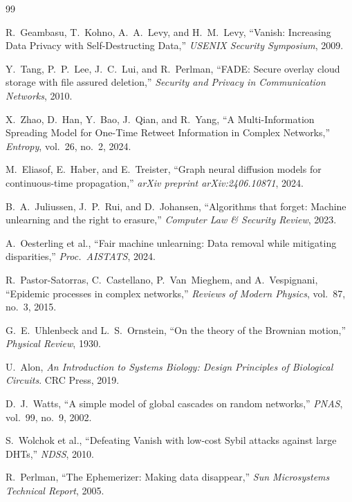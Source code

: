 \documentclass[conference]{IEEEtran}
\begin{document}
\begin{thebibliography}{99}

R.~Geambasu, T.~Kohno, A.~A.~Levy, and H.~M.~Levy,
``Vanish: Increasing Data Privacy with Self-Destructing Data,''
\textit{USENIX Security Symposium}, 2009.

Y.~Tang, P.~P.~Lee, J.~C.~Lui, and R.~Perlman,
``FADE: Secure overlay cloud storage with file assured deletion,''
\textit{Security and Privacy in Communication Networks}, 2010.

X.~Zhao, D.~Han, Y.~Bao, J.~Qian, and R.~Yang,
``A Multi-Information Spreading Model for One-Time Retweet
Information in Complex Networks,''
\textit{Entropy}, vol.~26, no.~2, 2024.

M.~Eliasof, E.~Haber, and E.~Treister,
``Graph neural diffusion models for continuous-time propagation,''
\textit{arXiv preprint arXiv:2406.10871}, 2024.

B.~A.~Juliussen, J.~P.~Rui, and D.~Johansen,
``Algorithms that forget: Machine unlearning and the right
to erasure,''
\textit{Computer Law \& Security Review}, 2023.

A.~Oesterling et al.,
``Fair machine unlearning: Data removal while mitigating
disparities,''
\textit{Proc.\ AISTATS}, 2024.

R.~Pastor-Satorras, C.~Castellano, P.~Van~Mieghem, and
A.~Vespignani,
``Epidemic processes in complex networks,''
\textit{Reviews of Modern Physics}, vol.~87, no.~3, 2015.

G.~E.~Uhlenbeck and L.~S.~Ornstein,
``On the theory of the Brownian motion,''
\textit{Physical Review}, 1930.

U.~Alon,
\textit{An Introduction to Systems Biology: Design Principles
of Biological Circuits}.
CRC Press, 2019.

D.~J.~Watts,
``A simple model of global cascades on random networks,''
\textit{PNAS}, vol.~99, no.~9, 2002.

S.~Wolchok et al.,
``Defeating Vanish with low-cost Sybil attacks against
large DHTs,''
\textit{NDSS}, 2010.

R.~Perlman,
``The Ephemerizer: Making data disappear,''
\textit{Sun Microsystems Technical Report}, 2005.


\end{thebibliography}
\end{document}
